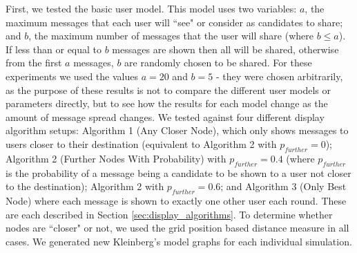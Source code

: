 \documentclass[bsc,frontabs,twoside,singlespacing,parskip,deptreport]{infthesis}     %
\begin{document}
First, we tested the basic user model. This model uses two variables: $a$, the maximum messages that each user will ``see" or consider as candidates to share; and $b$, the maximum number of messages that the user will share (where $b \leq a$). If less than or equal to $b$ messages are shown then all will be shared, otherwise from the first $a$ messages, $b$ are randomly chosen to be shared. For these experiments we used the values $a = 20$ and $b = 5$ - they were chosen arbitrarily, as the purpose of these results is not to compare the different user models or parameters directly, but to see how the results for each model change as the amount of message spread changes. We tested against four different display algorithm setups: Algorithm 1 (Any Closer Node), which only shows messages to users closer to their destination (equivalent to Algorithm 2 with $p_{further}=0$); Algorithm 2 (Further Nodes With Probability) with $p_{further}=0.4$ (where $p_{further}$ is the probability of a message being a candidate to be shown to a user not closer to the destination); Algorithm 2 with $p_{further}=0.6$; and Algorithm 3 (Only Best Node) where each message is shown to exactly one other user each round. These are each described in Section \ref{sec:display_algorithms}. To determine whether nodes are ``closer" or not, we used the grid position based distance measure in all cases. We generated new Kleinberg's model graphs for each individual simulation.
\end{document}
